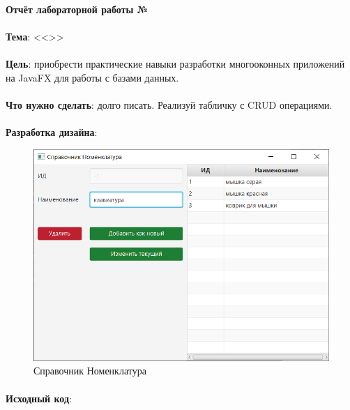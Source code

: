 \documentclass[12pt, a4paper, simple]{eskdtext}
\def \gpiDocTopic {Отчёт лабораторной работы №\gpiDocNum}
\begin{document}
    
    \begin{center}
        \textbf{\gpiDocTopic}
    \end{center}

    \paragraph{} \textbf{Тема}: <<\gpiTopicRep>>

    \paragraph{} \textbf{Цель}:
    приобрести практические навыки разработки многооконных приложений на JavaFX для работы с базами данных.

    \paragraph{} \textbf{Что нужно сделать}:
    долго писать.
    Реализуй табличку с CRUD операциями.

    \paragraph{} \textbf{Разработка дизайна}:

    \begin{figure}[!h]
        \centering
        \includegraphics[]
            {_assets/RM_Nomenclature.png}
        \caption{Справочник Номенклатура}
    \end{figure}

    \paragraph{} \textbf{Исходный код}: 
\end{document}
